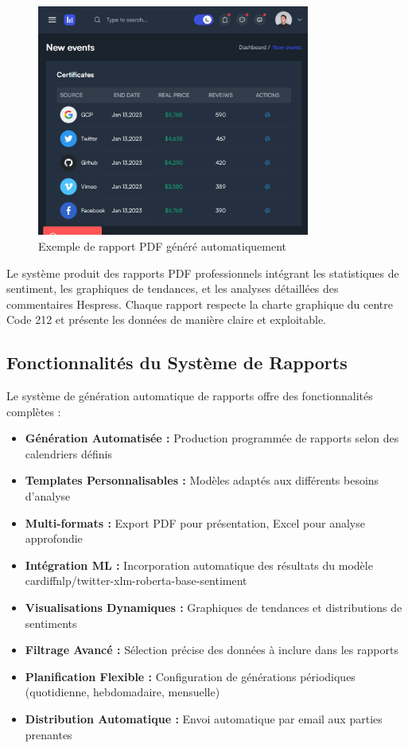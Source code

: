 \begin{figure}[H]
\centering
\includegraphics[width=0.8\textwidth]{assets/images/certifs-list.png}
\caption{Exemple de rapport PDF généré automatiquement}
\label{fig:generated-pdf-report}
\end{figure}

Le système produit des rapports PDF professionnels intégrant les statistiques de sentiment, les graphiques de tendances, et les analyses détaillées des commentaires Hespress. Chaque rapport respecte la charte graphique du centre Code 212 et présente les données de manière claire et exploitable.

\subsection{Fonctionnalités du Système de Rapports}

Le système de génération automatique de rapports offre des fonctionnalités complètes :

\begin{itemize}
    \item \textbf{Génération Automatisée :} Production programmée de rapports selon des calendriers définis
    \item \textbf{Templates Personnalisables :} Modèles adaptés aux différents besoins d'analyse
    \item \textbf{Multi-formats :} Export PDF pour présentation, Excel pour analyse approfondie
    \item \textbf{Intégration ML :} Incorporation automatique des résultats du modèle cardiffnlp/twitter-xlm-roberta-base-sentiment
    \item \textbf{Visualisations Dynamiques :} Graphiques de tendances et distributions de sentiments
    \item \textbf{Filtrage Avancé :} Sélection précise des données à inclure dans les rapports
    \item \textbf{Planification Flexible :} Configuration de générations périodiques (quotidienne, hebdomadaire, mensuelle)
    \item \textbf{Distribution Automatique :} Envoi automatique par email aux parties prenantes
\end{itemize}


